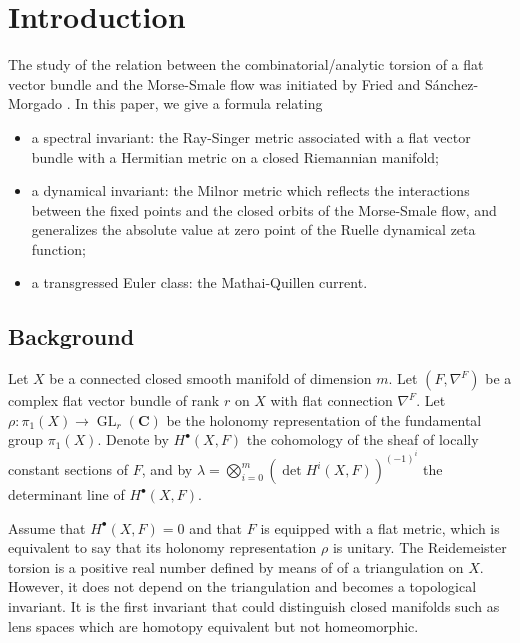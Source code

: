 \documentclass[JEP,XML,SOM,Unicode]{cedram}
\newcommand{\sbullet}{{\scriptscriptstyle\bullet}}
\theoremstyle{plain}
\theoremstyle{definition}
\theoremstyle{remark}
\newcommand{\bC}{\mathbf{C}}
\DeclareMathOperator{\GL}{GL}
\begin{document}
\maketitle
\tableofcontents
\mainmatter

\section*{Introduction}
The study of the relation between the combinatorial/analytic torsion of
a flat vector bundle and the Morse-Smale flow was initiated by Fried \cite{Friedconj} and
Sánchez-Morgado \cite{MorgadoMorseSmale}.
In this paper, we give a formula relating
\begin{itemize}
\item a spectral invariant: the Ray-Singer metric associated
with a flat vector bundle with a Hermitian metric on a closed Riemannian
manifold;
\item a dynamical invariant: the Milnor metric which reflects
the interactions between the fixed points and the
closed orbits of the Morse-Smale flow, and generalizes the
absolute value at zero point of the Ruelle dynamical zeta function;
\item a transgressed Euler class:
the Mathai-Quillen current.
\end{itemize}

\subsection{Background}
Let $X$ be a connected closed smooth manifold of dimension $m$. Let
$(F,\nabla^{F})$ be a complex
flat vector bundle of rank $r$ on $X$ with flat connection
$\nabla^{F}$. Let $\rho: \pi_1(X)\rightarrow \GL_r(\bC)$ be the
holonomy representation of the
fundamental group $\pi_1(X)$.
Denote by $H^\sbullet(X,F)$ the cohomology of
the sheaf of locally constant sections of $F$, and by
$\lambda=\bigotimes_{i=0}^{m}(\det H^{i}(X,F))^{(-1)^{i}}$ the
determinant line of $H^{\sbullet}(X,F)$.

{Assume that $H^{\sbullet}(X,F)=0$ and that $F$ is equipped
with a flat metric, which is equivalent to say that its holonomy
representation $\rho$ is unitary.
The Reidemeister torsion \cite{ReidemeisterTorsion,FranzTorsion,dRTorsion} is a positive real number
defined by means of of a triangulation on $X$. However, it does not depend on the
triangulation and becomes a topological invariant. It is the first
invariant that could distinguish closed manifolds such as lens spaces
which are homotopy equivalent but not homeomorphic.}
\end{document}
